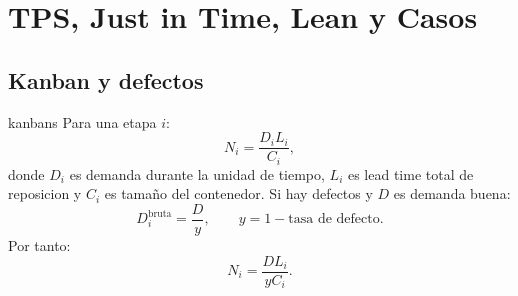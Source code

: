 \section{TPS, Just in Time, Lean y Casos}

\subsection{Kanban y defectos}

\begin{materia}{kanbans}
Para una etapa $i$:
\[
  N_i=\frac{D_iL_i}{C_i},
\]
donde $D_i$ es demanda durante la unidad de tiempo, $L_i$ es lead time total de reposicion y $C_i$ es tamaño del contenedor. Si hay defectos y $D$ es demanda buena:
\[
  D_i^{\text{bruta}}=\frac{D}{y},\qquad y=1-\text{tasa de defecto}.
\]
Por tanto:
\[
  N_i=\frac{DL_i}{yC_i}.
\]
\end{materia}

